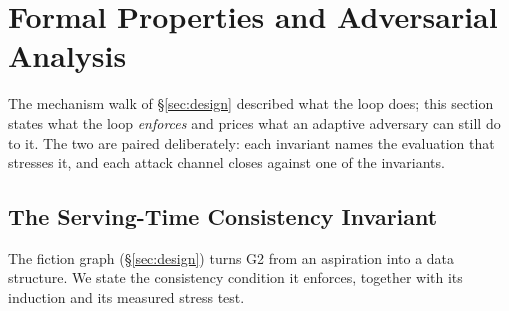 \section{Formal Properties and Adversarial Analysis}
\label{sec:formal}

The mechanism walk of \S\ref{sec:design} described what the loop does;
this section states what the loop \emph{enforces} and prices what an
adaptive adversary can still do to it. The two are paired deliberately:
each invariant names the evaluation that stresses it, and each attack
channel closes against one of the invariants.

\subsection{The Serving-Time Consistency Invariant}
\label{sec:invariant}

The fiction graph (\S\ref{sec:design}) turns G2 from an aspiration into a
data structure. We state the consistency condition it enforces, together
with its induction and its measured stress test.

